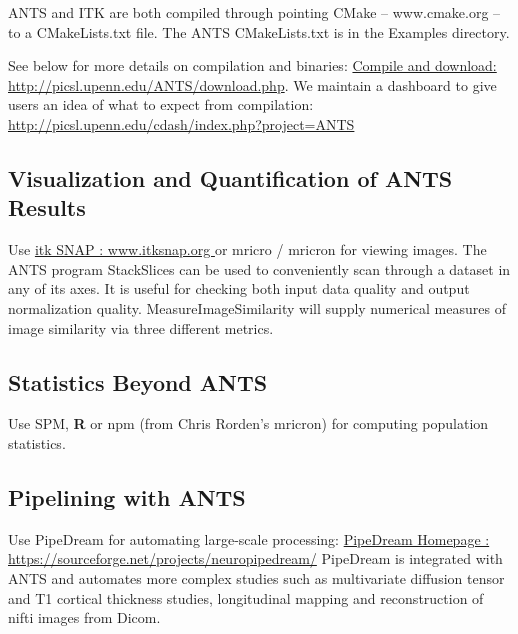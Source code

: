 \documentclass{InsightArticle}
\begin{document}
ANTS and ITK are both compiled through pointing CMake -- www.cmake.org
-- to a CMakeLists.txt file.  The ANTS CMakeLists.txt is in the
Examples directory.  

See below for more details on compilation and binaries: \newline
\href{http://picsl.upenn.edu/ANTS/download.php}{Compile and download: http://picsl.upenn.edu/ANTS/download.php}.
We maintain a dashboard to give users an idea of what to expect 
from compilation:\newline
\href{http://picsl.upenn.edu/cdash/index.php?project=ANTS}{http://picsl.upenn.edu/cdash/index.php?project=ANTS}


\subsection{Visualization and Quantification of ANTS Results}
Use \href{www.itksnap.org}{itk SNAP : www.itksnap.org } or mricro / mricron for viewing
images.  The ANTS program StackSlices can be used to conveniently scan
through a dataset in any of its axes.  It is useful for checking both
input data quality and output normalization quality.  MeasureImageSimilarity 
will supply numerical measures of image similarity via three different metrics. 

\subsection{Statistics Beyond ANTS}
Use SPM, {\bf R} or npm (from Chris Rorden's mricron) for computing population statistics.

\subsection{Pipelining with ANTS}
Use PipeDream for automating large-scale processing:\newline
\href{https://sourceforge.net/projects/neuropipedream/}{PipeDream
  Homepage :
  https://sourceforge.net/projects/neuropipedream/} \newline PipeDream
is integrated with ANTS and automates more complex studies such as
multivariate diffusion tensor and T1 cortical thickness studies,
longitudinal mapping and reconstruction of nifti images from Dicom.



%
%



\end{document}
